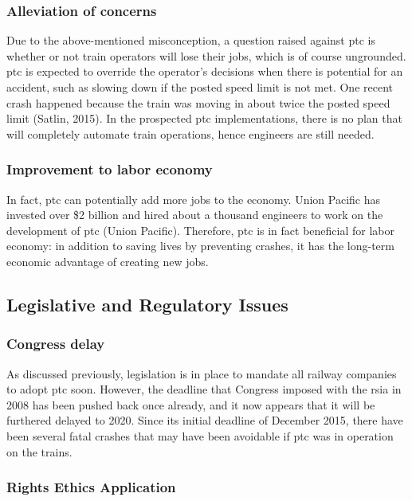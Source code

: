 \documentclass[11pt, titlepage]{article}
\begin{document}
\subsubsection{Alleviation of concerns}

Due to the above-mentioned misconception, a question raised against \gls{ptc} is
whether or not train operators will lose their jobs, which is of course ungrounded.
\gls{ptc} is expected to override the operator’s decisions when there is potential
for an accident, such as slowing down if the posted speed limit is not met. One
recent crash happened because the train was moving in about twice the posted speed
limit (Satlin, 2015). In the prospected \gls{ptc} implementations, there is no plan
that will completely automate train operations, hence engineers are still needed.

\subsubsection{Improvement to labor economy}

In fact, \gls{ptc} can potentially add more jobs to the economy. Union Pacific has
invested over \$2 billion and hired about a thousand engineers to work on the
development of \gls{ptc} (Union Pacific). Therefore, \gls{ptc} is in fact beneficial
for labor economy: in addition to saving lives by preventing crashes, it has the
long-term economic advantage of creating new jobs.

\subsection{Legislative and Regulatory Issues}

\subsubsection{Congress delay}

As discussed previously, legislation is in place to mandate all railway companies to
adopt \gls{ptc} soon. However, the deadline that Congress imposed with the
\gls{rsia} in 2008 has been pushed back once already, and it now appears that it
will be furthered delayed to 2020. Since its initial deadline of December 2015,
there have been several fatal crashes that may have been avoidable if \gls{ptc} was
in operation on the trains.

\subsubsection{Rights Ethics Application}
\end{document}
